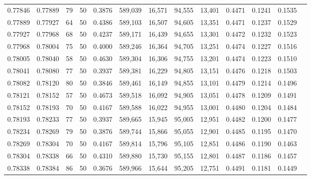 \begin{tabular}{rrrrrrrrrrrrr}
0.77846 & 0.77889 &    79 &  50 &                                     0.3876 & 589,039 &  16,571 &  94,555 &  13,401 & 0.4471 & 0.1241 & 0.1535 \\
0.77889 & 0.77927 &    64 &  50 &                                     0.4386 & 589,103 &  16,507 &  94,605 &  13,351 & 0.4471 & 0.1237 & 0.1529 \\
0.77927 & 0.77968 &    68 &  50 &                                     0.4237 & 589,171 &  16,439 &  94,655 &  13,301 & 0.4472 & 0.1232 & 0.1523 \\
0.77968 & 0.78004 &    75 &  50 &                                     0.4000 & 589,246 &  16,364 &  94,705 &  13,251 & 0.4474 & 0.1227 & 0.1516 \\
0.78005 & 0.78040 &    58 &  50 &                                     0.4630 & 589,304 &  16,306 &  94,755 &  13,201 & 0.4474 & 0.1223 & 0.1510 \\
0.78041 & 0.78080 &    77 &  50 &                                     0.3937 & 589,381 &  16,229 &  94,805 &  13,151 & 0.4476 & 0.1218 & 0.1503 \\
0.78082 & 0.78120 &    80 &  50 &                                     0.3846 & 589,461 &  16,149 &  94,855 &  13,101 & 0.4479 & 0.1214 & 0.1496 \\
0.78121 & 0.78152 &    57 &  50 &                                     0.4673 & 589,518 &  16,092 &  94,905 &  13,051 & 0.4478 & 0.1209 & 0.1491 \\
0.78152 & 0.78193 &    70 &  50 &                                     0.4167 & 589,588 &  16,022 &  94,955 &  13,001 & 0.4480 & 0.1204 & 0.1484 \\
0.78193 & 0.78233 &    77 &  50 &                                     0.3937 & 589,665 &  15,945 &  95,005 &  12,951 & 0.4482 & 0.1200 & 0.1477 \\
0.78234 & 0.78269 &    79 &  50 &                                     0.3876 & 589,744 &  15,866 &  95,055 &  12,901 & 0.4485 & 0.1195 & 0.1470 \\
0.78269 & 0.78304 &    70 &  50 &                                     0.4167 & 589,814 &  15,796 &  95,105 &  12,851 & 0.4486 & 0.1190 & 0.1463 \\
0.78304 & 0.78338 &    66 &  50 &                                     0.4310 & 589,880 &  15,730 &  95,155 &  12,801 & 0.4487 & 0.1186 & 0.1457 \\
0.78338 & 0.78384 &    86 &  50 &                                     0.3676 & 589,966 &  15,644 &  95,205 &  12,751 & 0.4491 & 0.1181 & 0.1449 \\

\end{tabular}
